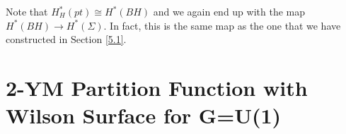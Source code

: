\documentclass[11pt]{report}
\theoremstyle{plain}
\theoremstyle{definition}
\theoremstyle{remark}
\theoremstyle{remark}
\numberwithin{equation}{section}
\begin{document}
Note that $H^*_H(pt) \cong H^*(BH)$ and we again end up with the map $H^*(BH) \to H^*(\Sigma)$. In fact, this is the same map as the one that we have constructed 
in Section \ref{5.1}.

%

%








%



\section{2-YM Partition Function with Wilson Surface for G=U(1)}
\end{document}
